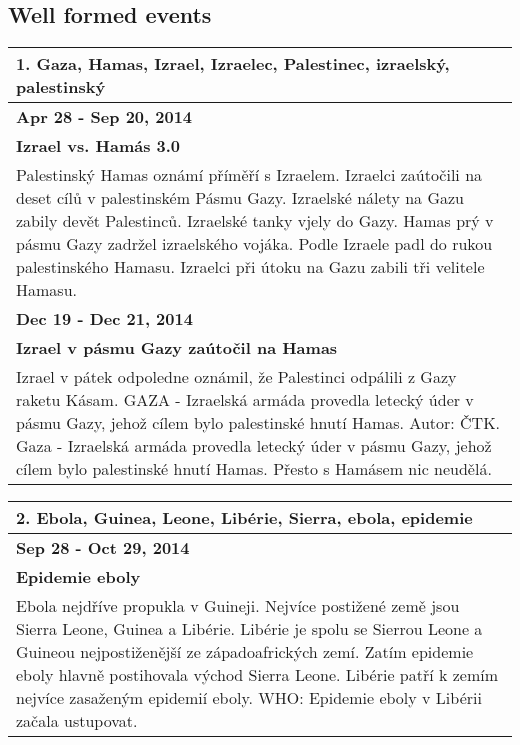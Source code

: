 \subsection*{Well formed events}
\begin{tabularx}{\linewidth}{p{\linewidth}} \toprule[1.5pt]
\bf 1. Gaza, Hamas, Izrael, Izraelec, Palestinec, izraelský, palestinský \\ \midrule
\bf Apr 28 - Sep 20, 2014 \\ \midrule
\bf Izrael vs. Hamás 3.0 \\
Palestinský Hamas oznámí příměří s Izraelem. Izraelci zaútočili na deset cílů v palestinském Pásmu Gazy. Izraelské nálety na Gazu zabily devět Palestinců. Izraelské tanky vjely do Gazy. Hamas prý v pásmu Gazy zadržel izraelského vojáka. Podle Izraele padl do rukou palestinského Hamasu. Izraelci při útoku na Gazu zabili tři velitele Hamasu. \\ \bottomrule[1.25pt]

\bf Dec 19 - Dec 21, 2014 \\ \midrule
\bf Izrael v pásmu Gazy zaútočil na Hamas \\
Izrael v pátek odpoledne oznámil, že Palestinci odpálili z Gazy raketu Kásam. GAZA - Izraelská armáda provedla letecký úder v pásmu Gazy, jehož cílem bylo palestinské hnutí Hamas. Autor: ČTK. Gaza - Izraelská armáda provedla letecký úder v pásmu Gazy, jehož cílem bylo palestinské hnutí Hamas. Přesto s Hamásem nic neudělá. \\ \bottomrule[1.25pt]
\end{tabularx}

\hspace{\fill}

\begin{tabularx}{\linewidth}{p{\linewidth}} \toprule[1.5pt]
\bf 2. Ebola, Guinea, Leone, Libérie, Sierra, ebola, epidemie \\ \midrule
\bf Sep 28 - Oct 29, 2014 \\ \midrule
\bf Epidemie eboly \\
Ebola nejdříve propukla v Guineji. Nejvíce postižené země jsou Sierra Leone, Guinea a Libérie. Libérie je spolu se Sierrou Leone a Guineou nejpostiženější ze západoafrických zemí. Zatím epidemie eboly hlavně postihovala východ Sierra Leone. Libérie patří k zemím nejvíce zasaženým epidemií eboly. WHO: Epidemie eboly v Libérii začala ustupovat. \\ \bottomrule[1.25pt]
\end{tabularx}
\hspace{\fill}

